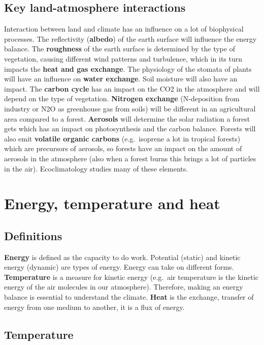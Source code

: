 \documentclass[oneside]{book}
\begin{document}
\subsection{Key land-atmosphere
interactions}\label{key-land-atmosphere-interactions}

Interaction between land and climate has an influence on a lot of
biophysical processes. The reflectivity (\textbf{albedo}) of the earth
surface will influence the energy balance. The \textbf{roughness} of the
earth surface is determined by the type of vegetation, causing different
wind patterns and turbulence, which in its turn impacts the \textbf{heat
and gas exchange}. The physiology of the stomata of plants will have an
influence on \textbf{water exchange}. Soil moisture will also have an
impact. The \textbf{carbon cycle} has an impact on the CO2 in the
atmosphere and will depend on the type of vegetation. \textbf{Nitrogen
exchange} (N-deposition from industry or N2O as greenhouse gas from
soils) will be different in an agricultural area compared to a forest.
\textbf{Aerosols} will determine the solar radiation a forest gets which
has an impact on photosynthesis and the carbon balance. Forests will
also emit \textbf{volatile organic carbons} (e.g.~isoprene a lot in
tropical forests) which are precursors of aerosols, so forests have an
impact on the amount of aerosols in the atmosphere (also when a forest
burns this brings a lot of particles in the air). Ecoclimatology studies
many of these elements.

\section{Energy, temperature and
heat}\label{energy-temperature-and-heat}

\subsection{Definitions}\label{definitions}

\textbf{Energy} is defined as the capacity to do work. Potential
(static) and kinetic energy (dynamic) are types of energy. Energy can
take on different forms. \textbf{Temperature} is a measure for kinetic
energy (e.g.~air temperature is the kinetic energy of the air molecules
in our atmosphere). Therefore, making an energy balance is essential to
understand the climate. \textbf{Heat} is the exchange, transfer of
energy from one medium to another, it is a flux of energy.

\subsection{Temperature}\label{temperature}
\end{document}
